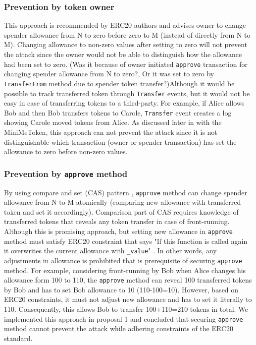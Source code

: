 \subsubsection*{Prevention by token owner} This approach is recommended by ERC20 authors \cite{Ref08} and advises owner to change spender allowance from N to zero before zero to M (instead of directly from N to M). Changing allowance to non-zero values after setting to zero will not prevent the attack since the owner would not be able to distinguish how the allowance had been set to zero. (\ie Was it because of owner initiated \texttt{approve} transaction for changing spender allowance from N to zero?, Or it was set to zero by \texttt{transferFrom} method due to spender token transfer?)\newline Although it would be possible to track transferred token through \texttt{Transfer} events, but it would not be easy in case of transferring tokens to a third-party. For example, if Alice allows Bob and then Bob transfers tokens to Carole, \texttt{Transfer} event creates a log showing Carole moved tokens from Alice. As discussed later in with the \textsf{MiniMeToken}, this approach can not prevent the attack since it is not distinguishable which transaction (\ie owner or spender transaction) has set the allowance to zero before non-zero values.
	
\subsubsection*{Prevention by \texttt{approve} method} By using compare and set (CAS) pattern \cite{Ref06}, \texttt{approve} method can change spender allowance from N to M atomically (\ie comparing new allowance with transferred token and set it accordingly). Comparison part of CAS requires knowledge of transferred tokens that reveals any token transfer in case of front-running. Although this is promising approach, but setting new allowance in \texttt{approve} method must satisfy ERC20 constraint that says "If this function is called again it overwrites the current allowance with \texttt{\_value}" \cite{Ref08}. In other words, any adjustments in allowance is prohibited that is prerequisite of securing \texttt{approve} method. For example, considering front-running by Bob when Alice changes his allowance form 100 to 110, the \texttt{approve} method can reveal 100 transferred tokens by Bob and has to set Bob allowance to 10 (110-100=10). However, based on ERC20 constraints, it must not adjust new allowance and has to set it literally to 110. Consequently, this allows Bob to transfer 100+110=210 tokens in total. We implemented this approach in proposal 1 and concluded that securing \texttt{approve} method cannot prevent the attack while adhering constraints of the ERC20 standard.
	
